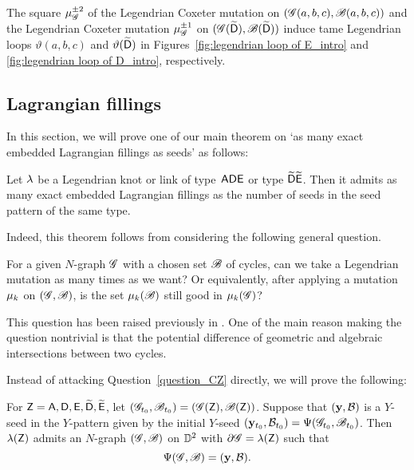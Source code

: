 \begin{theorem}\label{thm:legendrian loop}
The square $\mu_\mathscr{G}^{\pm 2}$ of the Legendrian Coxeter mutation 
 on $(\mathscr{G}(a,b,c),\mathscr{B}(a,b,c))$ 
and the Legendrian Coxeter mutation $\mu_\mathscr{G}^{\pm1}$ on 
$(\mathscr{G}(\widetilde{\mathsf{D}}),\mathscr{B}(\widetilde{\mathsf{D}}))$ induce 
tame Legendrian loops $\vartheta(a,b,c)$ and $\vartheta(\widetilde{\mathsf{D}})$ in Figures~\ref{fig:legendrian loop of E_intro} and \ref{fig:legendrian loop of D_intro}, respectively. 
\end{theorem}


\subsection{Lagrangian fillings}
In this section, we will prove one of our main theorem on `as many exact embedded Lagrangian fillings as seeds' as follows:
\begin{theorem}\label{theorem:seed many fillings}
Let $\lambda$ be a Legendrian knot or link of type~$\mathsf{ADE}$ or type $\widetilde{\mathsf{D}}\widetilde{\mathsf{E}}$.
Then it admits as many exact embedded Lagrangian fillings as the number of seeds in the seed pattern of the same type.
\end{theorem}

Indeed, this theorem follows from considering the following general question.
\begin{question}\label{question_CZ}
For a given $N$-graph $\mathscr{G}$ with a chosen set $\mathscr{B}$ of cycles, can we take a Legendrian mutation as many times as we want? Or equivalently, after applying a mutation $\mu_k$ on $(\mathscr{G}, \mathscr{B})$, is the set $\mu_k(\mathscr{B})$ still good in $\mu_k(\mathscr{G})$?
\end{question}

This question has been raised previously in \cite[Remark~7.13]{CZ2020}.
One of the main reason making the question nontrivial is that 
the potential difference of geometric and algebraic intersections between two cycles.

Instead of attacking Question~\ref{question_CZ} directly, we will prove the following:
\begin{proposition}\label{proposition:realizability}
For $\mathsf{Z} = \mathsf{A},\mathsf{D},\mathsf{E},\widetilde{\mathsf{D}}, \widetilde{\mathsf{E}}$, 
let $(\mathscr{G}_{t_0},\mathscr{B}_{t_0})=(\mathscr{G}(\mathsf{Z}), \mathscr{B}(\mathsf{Z}))$.
Suppose that $(\mathbf{y}, \mathcal{B})$ is a $Y$-seed in the $Y$-pattern given by the initial $Y$-seed $(\mathbf{y}_{t_0},\mathcal{B}_{t_0}) = \Psi(\mathscr{G}_{t_0},\mathscr{B}_{t_0})$. Then $\lambda(\mathsf{Z})$ admits an $N$-graph $(\mathscr{G}, \mathscr{B})$ on $\mathbb{D}^2$ with $\partial \mathscr{G} = \lambda(\mathsf{Z})$ such that 
\[
\Psi(\mathscr{G}, \mathscr{B}) = (\mathbf{y}, \mathcal{B}).
\]
\end{proposition}

